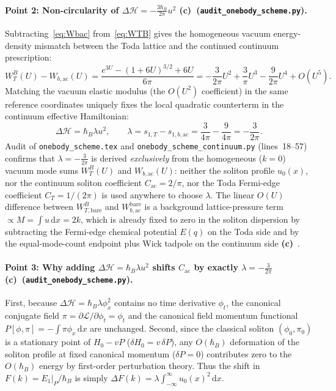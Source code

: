 \documentclass[11pt,a4paper]{article}
\newcommand{\Lc}{\textbf{(c)}\ }
\newcommand{\dd}{\mathrm d}
\newcommand{\scr}{\texttt{audit\_\allowbreak onebody\_\allowbreak scheme.py}}
\begin{document}
\paragraph{Point 2: Non-circularity of $\Delta\mathcal{H} = -\frac{3\hbar_B}{2\pi}u^2$ \Lc (\scr).}
Subtracting~\eqref{eq:Wbac} from~\eqref{eq:WTB} gives the homogeneous vacuum
energy-density mismatch between the Toda lattice and the continued continuum prescription:
\begin{equation}
  W_T^B(U) - W_{b,\mathrm{ac}}(U)
  = \frac{e^{3U} - (1+6U)^{3/2} + 6U}{6\pi}
  = -\frac{3}{2\pi}U^2 + \frac{3}{\pi}U^3 - \frac{9}{2\pi}U^4 + O(U^5).
  \label{eq:W-diff}
\end{equation}
Matching the vacuum elastic modulus (the $O(U^2)$ coefficient) in the same reference
coordinates uniquely fixes the local quadratic counterterm in the continuum effective
Hamiltonian:
\begin{equation}
  \Delta\mathcal{H} = \hbar_B\lambda u^2,
  \qquad
  \lambda = s_{1,T} - s_{1,b,\mathrm{ac}} = \frac{3}{4\pi} - \frac{9}{4\pi} = -\frac{3}{2\pi}.
  \label{eq:counterterm}
\end{equation}
Audit of \texttt{onebody\_\allowbreak scheme.tex} and
\texttt{onebody\_\allowbreak scheme\_\allowbreak continuum.py}
(lines~18--57) confirms that $\lambda = -\frac{3}{2\pi}$ is derived \emph{exclusively}
from the homogeneous ($k=0$) vacuum mode sums $W_T^B(U)$ and $W_{b,\mathrm{ac}}(U)$:
neither the soliton profile $u_0(x)$, nor the continuum soliton coefficient
$C_{\mathrm{ac}} = 2/\pi$, nor the Toda Fermi-edge coefficient $C_T = 1/(2\pi)$
is used anywhere to choose $\lambda$. The linear $O(U)$ difference between
$W_{T,\mathrm{bare}}^B$ and $W_{b,\mathrm{ac}}^{\mathrm{bare}}$ is a background
lattice-pressure term $\propto M = \int u\,\dd x = 2k$, which is already fixed
to zero in the soliton dispersion by subtracting the Fermi-edge chemical potential
$E(q)$ on the Toda side and by the equal-mode-count endpoint plus Wick tadpole on
the continuum side \Lc.

\paragraph{Point 3: Why adding $\Delta\mathcal{H} = \hbar_B\lambda u^2$ shifts $C_{\mathrm{ac}}$ by exactly $\lambda = -\frac{3}{2\pi}$ \Lc (\scr).}
First, because $\Delta\mathcal{H} = \hbar_B\lambda\phi_x^2$ contains no time derivative
$\phi_t$, the canonical conjugate field $\pi = \partial\mathcal{L}/\partial\phi_t = \phi_t$
and the canonical field momentum functional $P[\phi,\pi] = -\int\pi\phi_x\,\dd x$ are
unchanged. Second, since the classical soliton $(\phi_0,\pi_0)$ is a stationary point
of $H_0 - vP$ ($\delta H_0 = v\,\delta P$), any $O(\hbar_B)$ deformation of the soliton
profile at fixed canonical momentum ($\delta P = 0$) contributes zero to the $O(\hbar_B)$
energy by first-order perturbation theory. Thus the shift in $F(k) = E_1|_P/\hbar_B$ is
simply $\Delta F(k) = \lambda\int_{-\infty}^\infty u_0(x)^2\,\dd x$.
\end{document}
